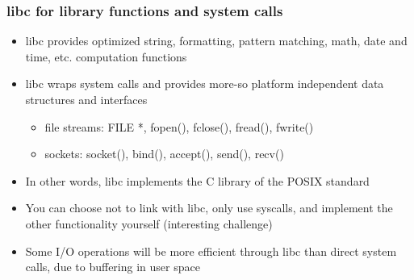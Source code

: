 \documentclass[11pt,xcolor=dvipsnames]{beamer}
\newcommand{\vs}{\vspace{0.5em}}
\begin{document}
\begin{frame}[fragile,t]
\frametitle{{\ttfamily libc} for library functions and system calls}
\begin{itemize}
  \item {\ttfamily libc} provides optimized string, formatting, pattern matching, math, date and time, etc. computation functions
  \item {\ttfamily libc} wraps system calls and provides more-so platform independent data structures and interfaces
  \begin{itemize}
    \item file streams: {\ttfamily FILE *, fopen(), fclose(), fread(), fwrite()}
    \item sockets: {\ttfamily socket(), bind(), accept(), send(), recv()}
  \end{itemize}
  \item In other words, {\ttfamily libc} implements the C library of the POSIX standard
  \vs
  \pause
  \item You can choose not to link with libc, only use syscalls, and implement the other functionality yourself (interesting challenge)
  \vs
  \pause
  \item Some I/O operations will be more efficient through {\ttfamily libc} than direct system calls, due to buffering in user space
\end{itemize}
\end{frame}
\end{document}
